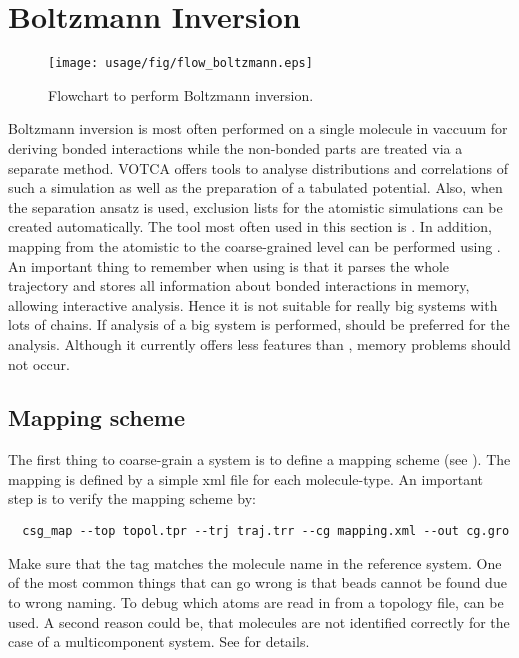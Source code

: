 \section{Boltzmann Inversion}
\begin{figure}
   \centering
   \texttt{[image: usage/fig/flow\_boltzmann.eps]}
   \caption{Flowchart to perform Boltzmann inversion.}
\end{figure}

Boltzmann inversion is most often performed on a single molecule in vaccuum for deriving bonded interactions while the non-bonded parts are treated via a separate method. VOTCA offers tools to analyse distributions and correlations of such a simulation as well as the preparation of a tabulated potential. Also, when the separation ansatz\cite{Tschoep:1998} is used, exclusion lists for the atomistic simulations can be created automatically. The tool most often used in this section is . In addition,  mapping from the atomistic to the coarse-grained level can be performed using . An important thing to remember when using  is that it parses the whole trajectory and stores all information about bonded interactions in memory, allowing interactive analysis. Hence it is not suitable for really big systems with lots of chains. If analysis of a big system is performed,  should be preferred for the analysis. Although it currently offers less features than , memory problems should not occur.

\subsection{Mapping scheme}
The first thing to coarse-grain a system is to define a mapping scheme (see ). The mapping is defined by a simple xml file for each molecule-type. An important step is to verify the mapping scheme by:

\begin{verbatim}
  csg_map --top topol.tpr --trj traj.trr --cg mapping.xml --out cg.gro
\end{verbatim}

Make sure that the  tag matches the molecule name in the reference system. One of the most common things that can go wrong is that beads cannot be found due to wrong naming. To debug which atoms are read in from a topology file,  can be used. A second reason could be, that molecules are not identified correctly for the case of a multicomponent system. See  for details.

